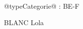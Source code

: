 \documentclass[a4paper,11pt,fleqn]{article}
\begin{document}
\begin{block}
\vspace{0.5cm}
\begin{minipage}{0.47\linewidth}
@typeCategorie@ : BE-F
\end{minipage}
\hfill {}
\begin{minipage}{0.5\linewidth}
BLANC Lola
\end{minipage}
\hfill {}

\end{block}

\vfill


\vfill
\end{document}
